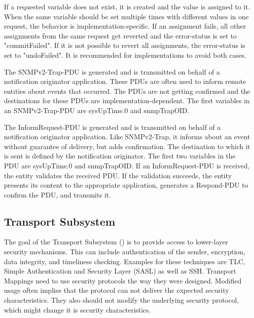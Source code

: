 If a requested variable does not exist, it is created and the value is assigned to it. When the same variable should be set multiple times with different values in one request, the behavior is implementation-specific. If an assignment fails, all other assignments from the same request get reverted and the error-status is set to "commitFailed". If it is not possible to revert all assignments, the error-status is set to "undoFailed". It is recommended for implementations to avoid both cases.

\newpage
The SNMPv2-Trap-PDU is generated and is transmitted on behalf of a notification originator application. These PDUs are often used to inform remote entities about events that occurred. The PDUs are not getting confirmed and the destinations for these PDUs are implementation-dependent. The first variables in an SNMPv2-Trap-PDU are sysUpTime.0 and snmpTrapOID.

The InformRequest-PDU is generated and is transmitted on behalf of a notification originator application. Like SNMPv2-Trap, it informs about an event without guarantee of delivery, but adds confirmation. The destination to which it is sent is defined by the notification originator. The first two variables in the PDU are sysUpTime.0 and snmpTrapOID. If an InformRequest-PDU is received, the entity validates the received PDU. If the validation succeeds, the entity presents its content to the appropriate application, generates a Respond-PDU to confirm the PDU, and transmits it.

\subsection{Transport Subsystem}
\label{Section:SNMP-TransportSubsystem}

The goal of the Transport Subsystem (\cite{RFC:RFC5590:2009}) is to provide access to lower-layer security mechanisms. This can include authentication of the sender, encryption, data integrity, and timeliness checking. Examples for these techniques are TLC, Simple Authentication and Security Layer (SASL) as well as SSH. Transport Mappings need to use security protocols the way they were designed. Modified usage often implies that the protocol can not deliver the expected security characteristics. They also should not modify the underlying security protocol, which might change it is security characteristics.


